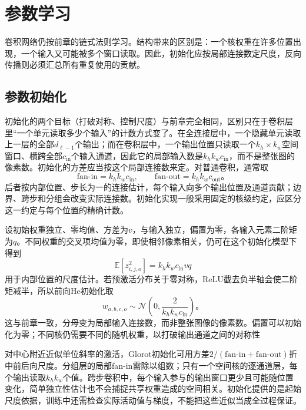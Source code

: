\section{参数学习}
\label{sec:cnn-learning}

卷积网络仍按前章的链式法则学习。结构带来的区别是：一个核权重在许多位置出现，一个输入又可能被多个窗口读取。因此，初始化应按局部连接数定尺度，反向传播则必须汇总所有重复使用的贡献。

\subsection{参数初始化}
\label{sec:cnn-initialization}

初始化的两个目标（打破对称、控制尺度）与前章完全相同，区别只在于卷积层里“一个单元读取多少个输入”的计数方式变了。在全连接层中，一个隐藏单元读取上一层的全部$d_{\ell-1}$个输出；而在卷积层中，一个输出位置只读取一个$k_h\times k_w$空间窗口、横跨全部$c_{\mathrm{in}}$个输入通道，因此它的局部输入数是$k_hk_wc_{\mathrm{in}}$，而不是整张图的像素数。初始化的方差应当按这个局部连接数来定。对普通卷积，通常取
\begin{equation}
  \mathrm{fan\text{-}in}=k_hk_wc_{\mathrm{in}},\qquad
  \mathrm{fan\text{-}out}=k_hk_wc_{\mathrm{out}}\text{。}
  \label{eq:cnn-fans}
\end{equation}
后者按内部位置、步长为一的连接估计，每个输入向多个输出位置及通道贡献；边界、跨步和分组会改变实际连接数。初始化实现一般采用固定的核级约定，应区分这一约定与每个位置的精确计数。

设初始权重独立、零均值、方差为$v$，与输入独立，偏置为零，各输入元素二阶矩为$q$。不同权重的交叉项均值为零，即使相邻像素相关，仍可在这个初始化模型下得到
\[
  \mathbb E[z_{i,j,o}^2]=k_hk_wc_{\mathrm{in}}vq
\]
用于内部位置的尺度估计。若预激活分布关于零对称，ReLU截去负半轴会使二阶矩减半，所以前向He初始化取
\begin{equation}
  w_{a,b,c,o}\sim\mathcal N\!\left(0,
          \frac{2}{k_hk_wc_{\mathrm{in}}}\right)\text{。}
  \label{eq:cnn-he-initialization}
\end{equation}
这与前章一致，分母变为局部输入连接数，而非整张图像的像素数。偏置可以初始化为零；不同核仍需要不同的随机权重，以打破输出通道之间的对称性

对中心附近近似单位斜率的激活，Glorot初始化可用方差$2/(\mathrm{fan\text{-}in}+\mathrm{fan\text{-}out})$折中前后向尺度。分组层的局部fan-in需除以组数；只有一个空间核的逐通道层，每个输出读取$k_hk_w$个值。跨步卷积中，每个输入参与的输出窗口更少且可能随位置变化，简单独立性估计也不会捕捉共享权重造成的空间相关。初始化提供的是起始尺度依据，训练中还需检查实际活动值与梯度，不能把这些近似当成全过程保证。

